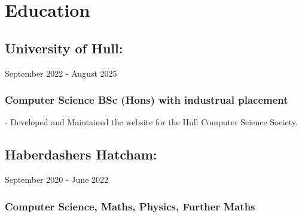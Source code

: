 \section{Education}

\subsection{University of Hull:} September 2022 - August 2025 \\

\subsubsection{Computer Science BSc (Hons) with industrual placement}
\:-\: Developed and Maintained the website for the Hull Computer Science Society.


\vspace{10pt}
\subsection{Haberdashers Hatcham:} September 2020 - June 2022 \\ 

\subsubsection{Computer Science, Maths, Physics, Further Maths}
